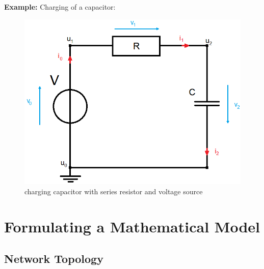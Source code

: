

\newcommand{\RomanNumeralCaps}[1]{\MakeUppercase{\romannumeral #1}}





	\begin{frame}
		\textbf{Example:} Charging of a capacitor:\\
		\begin{figure}[H]
			\centering
			\includegraphics[scale=0.4]{../Tex/pictures/Example1_simple_p2.png}
			\caption{charging capacitor with series resistor and voltage source}
			\label{circuit:charging of capacitor}
		\end{figure}
	\end{frame}

\section*{Formulating a Mathematical Model}

	\subsection{Network Topology}
		
